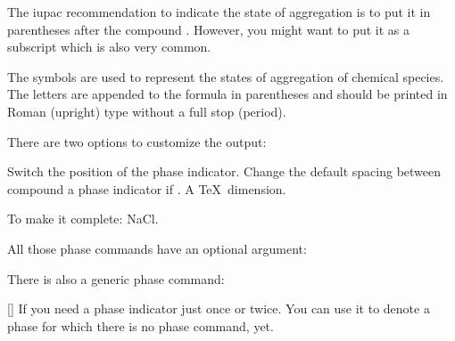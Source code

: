 \documentclass{chemmacros-manual}
\begin{document}
The \ac{iupac} recommendation to indicate the state of aggregation is to put
it in parentheses after the compound \cite{iupac:greenbook}.  However, you
might want to put it as a subscript which is also very common.

\begin{cnltxquote}
  The \textelp{} symbols are used to represent the states of aggregation of
  chemical species.  The letters are appended to the formula in parentheses
  and should be printed in Roman (upright) type without a full stop (period).
\end{cnltxquote}

There are two options to customize the output:
\begin{options}
    Switch the position of the phase indicator.
  \Default{.1333em}
    Change the default spacing between compound a phase indicator if
    . A \TeX\ dimension.
\end{options}
\begin{example}
  \par
  To make it complete: NaCl\aq.
\end{example}

All those phase commands have an optional argument:
\begin{example}
\end{example}

There is also a generic phase command:
\begin{commands}
  []
    If you need a phase indicator just once or twice.  You can use it to
    denote a phase for which there is no phase command, yet.
\end{commands}
\end{document}
